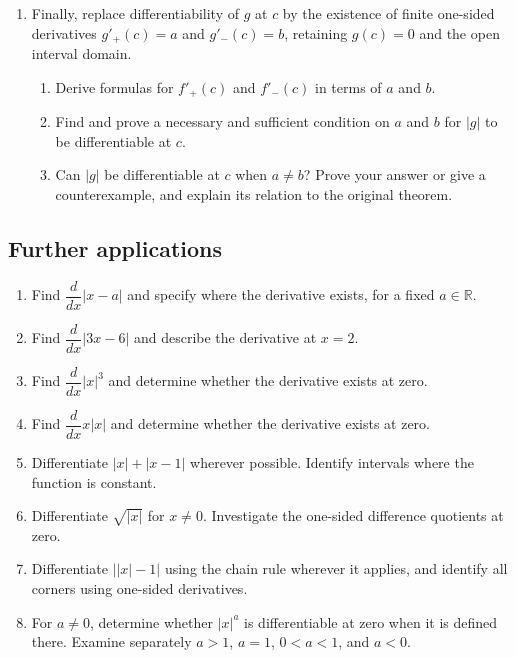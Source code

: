 \documentclass{self-check}
\begin{document}
\begin{enumerate}[resume]
\begin{enumerate}[label=(\alph*)]
\end{enumerate}
\item Finally, replace differentiability of $g$ at $c$ by the existence of finite one-sided derivatives $g'_+(c)=a$ and $g'_-(c)=b$, retaining $g(c)=0$ and the open interval domain.
\begin{enumerate}[label=(\alph*)]
\item Derive formulas for $f'_+(c)$ and $f'_-(c)$ in terms of $a$ and $b$.
\item Find and prove a necessary and sufficient condition on $a$ and $b$ for $|g|$ to be differentiable at $c$.
\item Can $|g|$ be differentiable at $c$ when $a\ne b$? Prove your answer or give a counterexample, and explain its relation to the original theorem.
\end{enumerate}
\end{enumerate}

\subsection*{Further applications}
\begin{enumerate}[resume]
\item Find $\dfrac{d}{dx}|x-a|$ and specify where the derivative exists, for a fixed $a\in\mathbb R$.
\item Find $\dfrac{d}{dx}|3x-6|$ and describe the derivative at $x=2$.
\item Find $\dfrac{d}{dx}|x|^3$ and determine whether the derivative exists at zero.
\item Find $\dfrac{d}{dx}x|x|$ and determine whether the derivative exists at zero.
\item Differentiate $|x|+|x-1|$ wherever possible. Identify intervals where the function is constant.
\item Differentiate $\sqrt{|x|}$ for $x\ne0$. Investigate the one-sided difference quotients at zero.
\item Differentiate $\bigl||x|-1\bigr|$ using the chain rule wherever it applies, and identify all corners using one-sided derivatives.
\item For $a\ne0$, determine whether $|x|^a$ is differentiable at zero when it is defined there. Examine separately $a>1$, $a=1$, $0<a<1$, and $a<0$.
\end{enumerate}
\end{document}
